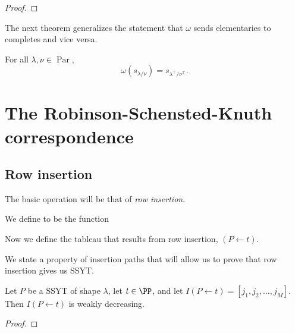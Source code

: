 \documentclass{article}
\DeclareMathOperator{\Par}{Par}
\begin{document}
\begin{proof}
\end{proof}

The next theorem generalizes the statement that $\omega$ sends elementaries to completes and vice versa.

\begin{theorem}
    For all $\lambda,\nu \in \Par$,
    \[
        \omega(s_{\lambda/\nu}) = s_{\lambda^\top/\nu^\top}.
    \]
\end{theorem}

\section{The Robinson-Schensted-Knuth correspondence}

\subsection{Row insertion}


The basic operation will be that of \textit{row insertion}.

\begin{definition}
    \ytabsmallbox
    We define  to be the function 

    \begin{algorithm}[H]
        \SetAlgoLined
    \end{algorithm}
\end{definition}

Now we define the tableau that results from row insertion, $(P \leftarrow t)$.

We state a property of insertion paths that will allow us to prove that row insertion gives us SSYT.

\begin{theorem}
    Let $P$ be a SSYT of shape $\lambda$, let $t \in \PP$, and let $I(P\leftarrow t) = [j_1,j_2,\ldots,j_M]$. Then $I(P\leftarrow t)$ is weakly decreasing.
\end{theorem}

\begin{proof}
\end{proof}
\end{document}
